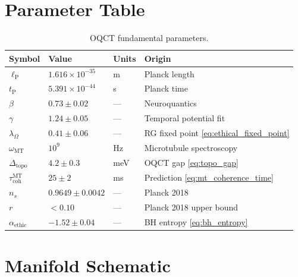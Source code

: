 \documentclass[12pt,a4paper]{article}
\theoremstyle{myrmk}
\newcommand{\lP}{\ell_{\mathrm{P}}}
\newcommand{\tP}{t_{\mathrm{P}}}
\begin{document}
\section{Parameter Table}
\label{app:params}

\begin{table}[H]
\centering
\caption{OQCT fundamental parameters.}
\label{tab:params}
\renewcommand{\arraystretch}{1.3}
\begin{tabular}{llll}
\toprule
\textbf{Symbol} & \textbf{Value} & \textbf{Units} & \textbf{Origin} \\
\midrule
$\lP$ & $1.616\times10^{-35}$ & m & Planck length \\
$\tP$ & $5.391\times10^{-44}$ & s & Planck time \\
$\beta$ & $0.73\pm0.02$ & --- & Neuroquantics \cite{Stanford2023} \\
$\gamma$ & $1.24\pm0.05$ & --- & Temporal potential fit \\
$\lambda_\Omega$ & $0.41\pm0.06$ & --- & RG fixed point \eqref{eq:ethical_fixed_point} \\
$\omega_{\mathrm{MT}}$ & $10^9$ & Hz & Microtubule spectroscopy \\
$\Delta_{\mathrm{topo}}$ & $4.2\pm0.3$ & meV & OQCT gap \eqref{eq:topo_gap} \\
$\tau_{\mathrm{coh}}^{\mathrm{MT}}$ & $25\pm2$ & ms & Prediction \eqref{eq:mt_coherence_time} \\
$n_s$ & $0.9649\pm0.0042$ & --- & Planck 2018 \cite{Planck2018} \\
$r$ & $<0.10$ & --- & Planck 2018 upper bound \\
$\alpha_{\mathrm{ethic}}$ & $-1.52\pm0.04$ & --- & BH entropy \eqref{eq:bh_entropy} \\
\bottomrule
\end{tabular}
\end{table}

\section{Manifold Schematic}
\label{app:viz}
\end{document}
